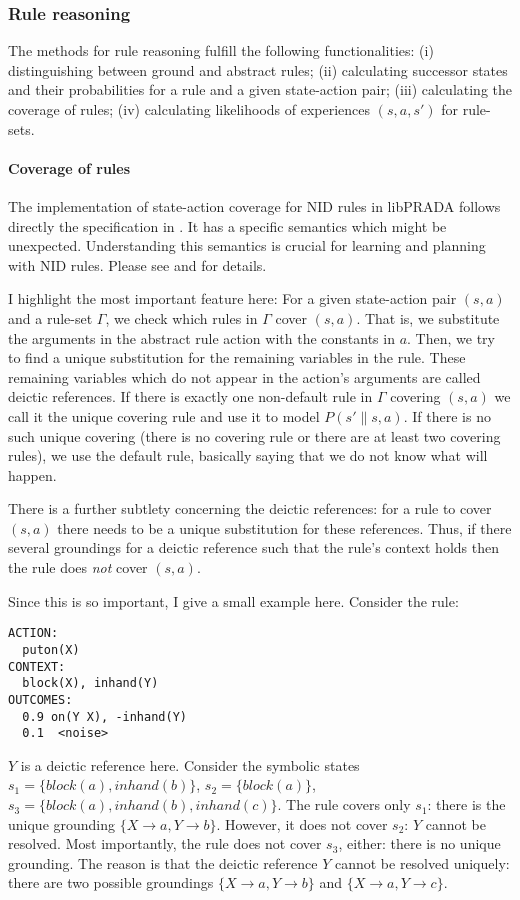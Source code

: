 \documentclass[10pt,twoside,twocolumn,fleqn]{article}
\begin{document}
\subsubsection{Rule reasoning}

The methods for rule reasoning fulfill the following functionalities: (i)
distinguishing between ground and abstract rules; (ii) calculating
successor states and their probabilities for a rule and a given
state-action pair; (iii) calculating the coverage of rules; (iv)
calculating likelihoods of experiences $(s,a,s')$ for rule-sets.

\paragraph{Coverage of rules}

The implementation of state-action coverage for NID rules in libPRADA
follows directly the specification in \citet{pasula07ai}. It has a specific
semantics which might be unexpected. Understanding this semantics is
crucial for learning and planning with NID rules. Please see
\citet{pasula07ai} and \citet{lang-toussaint-10jair} for details.

I highlight the most important feature here: For a given state-action pair
$(s,a)$ and a rule-set $\Gamma$, we check which rules in $\Gamma$ cover
$(s,a)$. That is, we substitute the arguments in the abstract rule action
with the constants in $a$. Then, we try to find a unique substitution for
the remaining variables in the rule. These remaining variables which do not
appear in the action's arguments are called deictic references. If there is
exactly one non-default rule in $\Gamma$ covering $(s,a)$ we call it the
unique covering rule and use it to model $P(s'\|s,a)$. If there is no such
unique covering (there is no covering rule or there are at least two
covering rules), we use the default rule, basically saying that we do not
know what will happen.

There is a further subtlety concerning the deictic references: for a rule
to cover $(s,a)$ there needs to be a unique substitution for these
references. Thus, if there several groundings for a deictic reference such
that the rule's context holds then the rule does \emph{not} cover $(s,a)$.

Since this is so important, I give a small example here. Consider the
rule:
\begin{lstlisting}
ACTION:
  puton(X)
CONTEXT:
  block(X), inhand(Y)
OUTCOMES:
  0.9 on(Y X), -inhand(Y)
  0.1  <noise>
\end{lstlisting}
$Y$ is a deictic reference here. Consider the symbolic states $s_1 =
\{block(a), inhand(b)\}$, $s_2 = \{block(a)\}$, $s_3 = \{block(a),
inhand(b), inhand(c)\}$. The rule covers only $s_1$: there is the unique
grounding $\{X \to a, Y \to b\}$. However, it does not cover $s_2$: $Y$
cannot be resolved. Most importantly, the rule does not cover $s_3$,
either: there is no unique grounding. The reason is that the deictic
reference $Y$ cannot be resolved uniquely: there are two possible
groundings $\{X \to a, Y \to b\}$ and $\{X \to a, Y \to c\}$.
\end{document}
